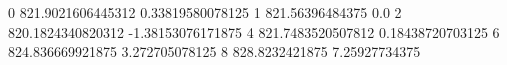 0 821.9021606445312 0.33819580078125
1 821.56396484375 0.0
2 820.1824340820312 -1.38153076171875
4 821.7483520507812 0.18438720703125
6 824.836669921875 3.272705078125
8 828.8232421875 7.25927734375
